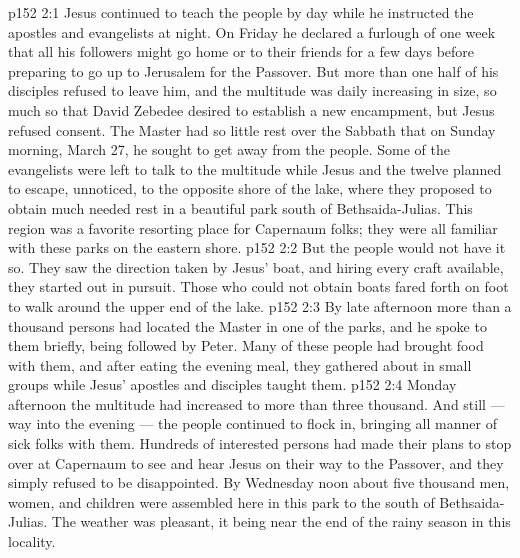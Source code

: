 \vs p152 2:1 Jesus continued to teach the people by day while he instructed the apostles and evangelists at night. On Friday he declared a furlough of one week that all his followers might go home or to their friends for a few days before preparing to go up to Jerusalem for the Passover. But more than one half of his disciples refused to leave him, and the multitude was daily increasing in size, so much so that David Zebedee desired to establish a new encampment, but Jesus refused consent. The Master had so little rest over the Sabbath that on Sunday morning, March 27, he sought to get away from the people. Some of the evangelists were left to talk to the multitude while Jesus and the twelve planned to escape, unnoticed, to the opposite shore of the lake, where they proposed to obtain much needed rest in a beautiful park south of Bethsaida\hyp{}Julias. This region was a favorite resorting place for Capernaum folks; they were all familiar with these parks on the eastern shore.
\vs p152 2:2 But the people would not have it so. They saw the direction taken by Jesus’ boat, and hiring every craft available, they started out in pursuit. Those who could not obtain boats fared forth on foot to walk around the upper end of the lake.
\vs p152 2:3 By late afternoon more than a thousand persons had located the Master in one of the parks, and he spoke to them briefly, being followed by Peter. Many of these people had brought food with them, and after eating the evening meal, they gathered about in small groups while Jesus’ apostles and disciples taught them.
\vs p152 2:4 Monday afternoon the multitude had increased to more than three thousand. And still --- way into the evening --- the people continued to flock in, bringing all manner of sick folks with them. Hundreds of interested persons had made their plans to stop over at Capernaum to see and hear Jesus on their way to the Passover, and they simply refused to be disappointed. By Wednesday noon about five thousand men, women, and children were assembled here in this park to the south of Bethsaida\hyp{}Julias. The weather was pleasant, it being near the end of the rainy season in this locality.
